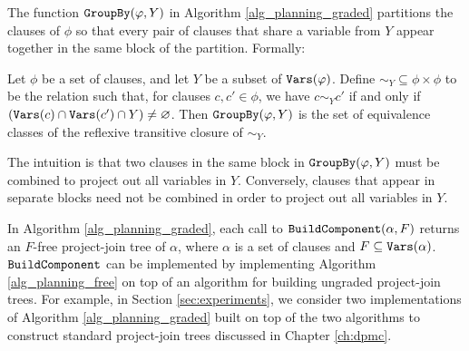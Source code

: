 The function $\texttt{\upshape GroupBy}(\varphi, Y)$ in Algorithm \ref{alg_planning_graded} partitions the clauses of $\phi$ so that every pair of clauses that share a variable from $Y$ appear together in the same block of the partition.
Formally:
\begin{definition}
\label{def:groupby}
Let $\phi$ be a set of clauses, and let $Y$ be a subset of $\texttt{\upshape Vars}(\varphi)$.
Define $\sim_Y \subseteq \phi \times \phi$ to be the relation such that, for clauses $c, c' \in \phi$, we have $c \sim_Y c'$ if and only if $(\texttt{\upshape Vars}(c) \cap \texttt{\upshape Vars}(c') \cap Y) \ne \varnothing$. Then $\texttt{\upshape GroupBy}(\varphi, Y)$ is the set of equivalence classes of the reflexive transitive closure of $\sim_Y$.
\end{definition}

The intuition is that two clauses in the same block in $\texttt{\upshape GroupBy}(\varphi, Y)$ must be combined to project out all variables in $Y$.
Conversely, clauses that appear in separate blocks need not be combined in order to project out all variables in $Y$. 

In Algorithm \ref{alg_planning_graded}, each call to $\texttt{\upshape BuildComponent}(\alpha, F)$ returns an $F$-free project-join tree of $\alpha$, where $\alpha$ is a set of clauses and $F \subseteq \texttt{\upshape Vars}(\alpha)$.
$\texttt{\upshape BuildComponent}$ can be implemented by implementing Algorithm \ref{alg_planning_free} on top of an algorithm for building ungraded project-join trees. 
For example, in Section \ref{sec:experiments}, we consider two implementations of Algorithm \ref{alg_planning_graded} built on top of the two algorithms to construct standard project-join trees \cite{dudek2020dpmc} discussed in Chapter \ref{ch:dpmc}.

